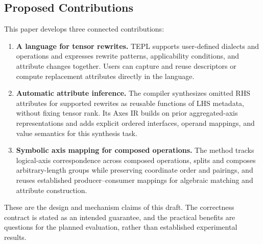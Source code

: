 \FloatBarrier
\subsection{Proposed Contributions}
This paper develops three connected contributions:
\begin{enumerate}
\item \textbf{A language for tensor rewrites.} TEPL supports user-defined
dialects and operations and expresses rewrite patterns, applicability
conditions, and attribute changes together. Users can capture and reuse
descriptors or compute replacement attributes directly in the language.
\item \textbf{Automatic attribute inference.} The compiler synthesizes omitted
RHS attributes for supported rewrites as reusable functions of LHS metadata,
without fixing tensor rank. Its Axes IR builds on prior aggregated-axis
representations and adds explicit ordered interfaces, operand mappings,
and value semantics for this synthesis task.
\item \textbf{Symbolic axis mapping for composed operations.} The method tracks
logical-axis correspondence across composed operations, splits and composes
arbitrary-length groups while preserving coordinate order and pairings,
and reuses established producer--consumer mappings for algebraic matching
and attribute construction.
\end{enumerate}
These are the design and mechanism claims of this draft. The correctness
contract is stated as an intended guarantee, and the practical benefits are
questions for the planned evaluation, rather than established experimental
results.
